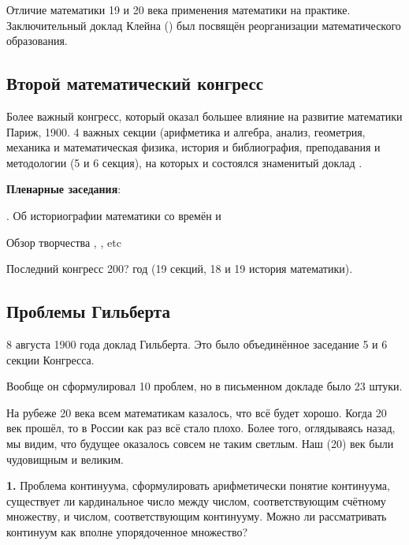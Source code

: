 \documentclass[a4paper,oneside,fleqn,10pt]{article}
\begin{document}
Отличие математики 19 и 20 века применения математики на практике.
Заключительный доклад Клейна () был посвящён
реорганизации математического образования.

\subsection{Второй математический конгресс}

Более важный конгресс, который оказал большее влияние на развитие
математики Париж, 1900.  4 важных секции (арифметика и алгебра,
анализ, геометрия, механика и математическая физика, история и
библиография, преподавания и методологии (5 и 6 секция), на которых и
состоялся знаменитый доклад .

\textbf{Пленарные заседания}:

\begin{items}{-2}
\item {}. Об историографии математики
  со времён  и 
\item {} Обзор творчества ,
  , etc
\item {}
\end{items}

Последний конгресс 200? год (19 секций, 18 и 19 история математики).

\subsection{Проблемы Гильберта}

8 августа 1900 года доклад Гильберта.  Это было объединённое заседание
5 и 6 секции Конгресса.

Вообще он сформулировал 10 проблем, но в письменном докладе было 23
штуки.

На рубеже 20 века всем математикам казалось, что всё будет
хорошо. Когда 20 век прошёл, то в России как раз всё стало
плохо. Более того, оглядываясь назад, мы видим, что будущее оказалось
совсем не таким светлым. Наш (20) век были чудовищным и великим.

\medskip

\textbf{1.} Проблема континуума, сформулировать арифметически понятие
континуума, существует ли кардинальное число между числом,
соответствующим счётному множеству, и числом, соответствующим
континууму. Можно ли рассматривать континуум как вполне упорядоченное
множество?
\end{document}
